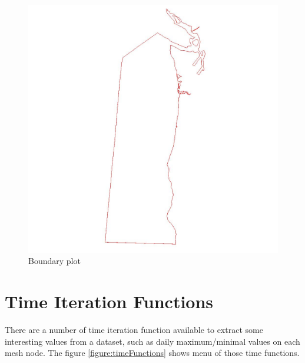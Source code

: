 \documentclass[12pt]{report}
\begin{document}
\begin{figure}
\begin{center}
\includegraphics{subsetBoundaryPlot300dpi}
\caption{Boundary plot}
\label{figure:subsetBoundaryPlot}
\end{center}
\end{figure} 



\section{Time Iteration Functions}

There are a number of time iteration function available to extract some interesting values from a dataset, such as
daily maximum/minimal values on each mesh node. The figure \ref{figure:timeFunctions} shows menu of those time functions.
\end{document}

